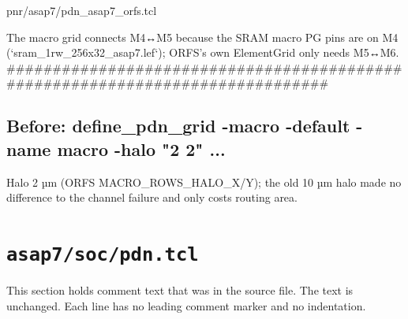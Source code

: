 \begin{relocated}{pnr/asap7/pdn_asap7_orfs.tcl}
\begin{textblock}
The macro grid connects M4↔M5 because the SRAM macro PG pins are on M4
(`sram_1rw_256x32_asap7.lef`); ORFS's own ElementGrid only needs M5↔M6.
##############################################################################
\end{textblock}

\subsection*{Before: define\_pdn\_grid -macro -default -name macro -halo "2 2" ...}

\begin{textblock}
Halo 2 µm (ORFS MACRO_ROWS_HALO_X/Y); the old 10 µm halo made no difference
to the channel failure and only costs routing area.
\end{textblock}

\end{relocated}

\section{\texttt{asap7/soc/pdn.tcl}}\label{tm:pd:asap7-soc-pdn-tcl}

This section holds comment text that was in the source file. The text is unchanged. Each line has no leading comment marker and no indentation.

